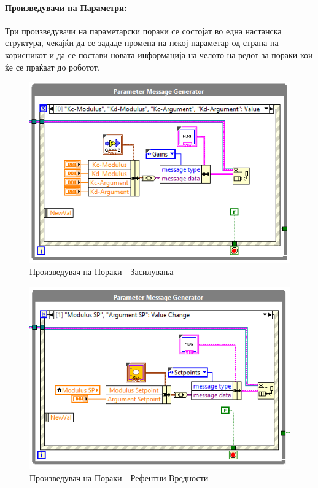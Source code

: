 \documentclass[12pt]{article}
\begin{document}
    \paragraph{Произведувачи на Параметри:\\}
      Три произведувачи на параметарски пораки се состојат во една настанска структура, чекајќи да се зададе промена на некој параметар од страна на корисникот и да се постави новата информација на челото на редот за пораки кои ќе се праќаат до роботот.
      \begin{figure}[H]
          \centering
          \includegraphics[width=0.75\linewidth]{./images/gain_message_generator.png}
          \caption{Произведувач на Пораки - Засилувања}
          \end{figure}
      \begin{figure}[H]
          \centering
          \includegraphics[width=0.75\linewidth]{./images/setpoint_message_generator.png}
          \caption{Произведувач на Пораки - Рефентни Вредности}
          \end{figure}
\end{document}
